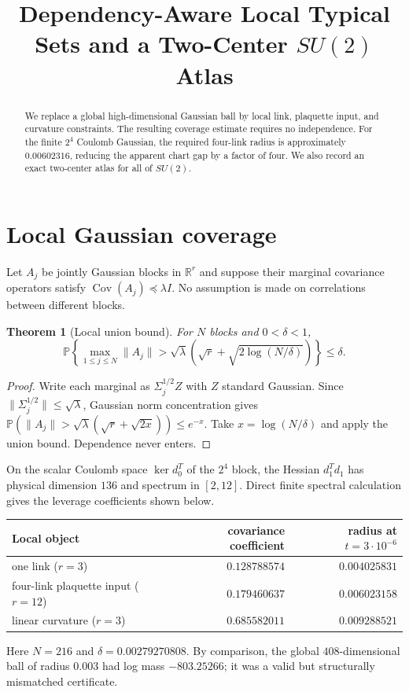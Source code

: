 \documentclass[11pt]{article}
\title{Dependency-Aware Local Typical Sets and a Two-Center $SU(2)$ Atlas}
\author{}
\date{}
\newtheorem{theorem}{Theorem}
\begin{document}
\maketitle

\begin{abstract}
We replace a global high-dimensional Gaussian ball by local link, plaquette
input, and curvature constraints.  The resulting coverage estimate requires
no independence.  For the finite $2^4$ Coulomb Gaussian, the required
four-link radius is approximately $0.00602316$, reducing the apparent chart
gap by a factor of four.  We also record an exact two-center atlas for all of
$SU(2)$.
\end{abstract}

\section{Local Gaussian coverage}
Let $A_j$ be jointly Gaussian blocks in $\mathbb R^r$ and suppose their
marginal covariance operators satisfy $\operatorname{Cov}(A_j)\preceq
\lambda I$.  No assumption is made on correlations between different blocks.

\begin{theorem}[Local union bound]
For $N$ blocks and $0<\delta<1$,
\[
 \mathbb P\left\{\max_{1\le j\le N}\|A_j\|>
 \sqrt\lambda\left(\sqrt r+\sqrt{2\log(N/\delta)}\right)\right\}
 \le\delta.
\]
\end{theorem}
\begin{proof}
Write each marginal as $\Sigma_j^{1/2}Z$ with $Z$ standard Gaussian.  Since
$\|\Sigma_j^{1/2}\|\le\sqrt\lambda$, Gaussian norm concentration gives
$\mathbb P(\|A_j\|>\sqrt\lambda(\sqrt r+\sqrt{2x}))\le e^{-x}$.
Take $x=\log(N/\delta)$ and apply the union bound.  Dependence never enters.
\end{proof}

On the scalar Coulomb space $\ker d_0^T$ of the $2^4$ block, the Hessian
$d_1^Td_1$ has physical dimension $136$ and spectrum in $[2,12]$.  Direct
finite spectral calculation gives the leverage coefficients shown below.

\begin{center}
\begin{tabular}{lrr}
\toprule
Local object & covariance coefficient & radius at $t=3\cdot10^{-6}$\\
\midrule
one link ($r=3$) & $0.128788574$ & $0.004025831$\\
four-link plaquette input ($r=12$) & $0.179460637$ & $0.006023158$\\
linear curvature ($r=3$) & $0.685582011$ & $0.009288521$\\
\bottomrule
\end{tabular}
\end{center}
Here $N=216$ and $\delta=0.00279270808$.  By comparison, the global
$408$-dimensional ball of radius $0.003$ had log mass $-803.25266$; it was a
valid but structurally mismatched certificate.
\end{document}
